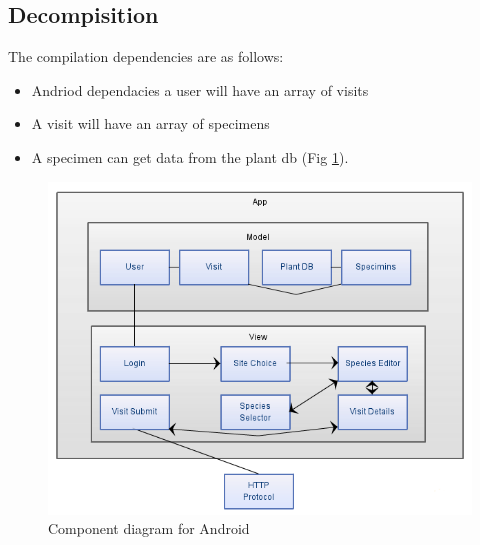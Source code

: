 \subsection{Decompisition}
	The compilation dependencies are as follows:
	\begin{itemize}
		\item Andriod dependacies a user will have an array of visits
		\item A visit will have an array of specimens
		\item A specimen can get data from the plant db (Fig \ref{fig:androidComponentDiagram}).
	\end{itemize}
	
	\begin{figure}
		\centering
			\includegraphics[scale=0.75]{android/useCaseDiagram.png}
		\caption{Component diagram for Android}
		\label{fig:androidComponentDiagram}
	\end{figure}